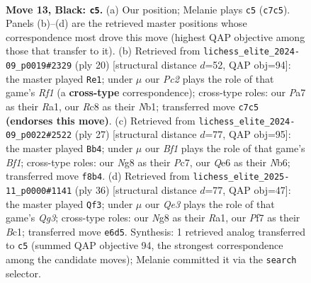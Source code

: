 \documentclass[11pt]{article}
\begin{document}
\clearpage

\begin{figure}[p]\centering
\begin{subfigure}{0.46\textwidth}\centering
\resizebox{\linewidth}{!}{%
\newchessgame
\chessboard[
  setfen={2r1kbnr/pbpp1ppp/4q3/4P3/2p2PPP/2P4R/PP3Q2/RNB1KB2 b Qk - 4 13},
  showmover=false,
  pgfstyle=straightmove, color=movearrow, markmove={c7-c5}
]}
\caption{}
\end{subfigure}\hfill
\begin{subfigure}{0.46\textwidth}\centering
\resizebox{\linewidth}{!}{%
\newchessgame
\chessboard[
  setfen={r3kbnr/2pq1pp1/p1pp4/4P2p/3p4/5Q1P/PPP2PP1/RNB2RK1 w kq - 1 11},
  showmover=false,
  pgfstyle=straightmove, color=movearrow, markmove={f1-e1}
]}
\caption{}
\end{subfigure}
\\[4pt]
\begin{subfigure}{0.46\textwidth}\centering
\resizebox{\linewidth}{!}{%
\newchessgame
\chessboard[
  setfen={r3kb1r/1bpp1ppp/1np1q3/4P3/2P2P2/1PN5/2Q3PP/1RB1KB1R b Kkq - 0 14},
  showmover=false,
  pgfstyle=straightmove, color=movearrow, markmove={f8-b4}
]}
\caption{}
\end{subfigure}\hfill
\begin{subfigure}{0.46\textwidth}\centering
\resizebox{\linewidth}{!}{%
\newchessgame
\chessboard[
  setfen={r3k2r/1pq2p2/pn2bb1p/4p3/2p5/N1P3QP/P1BP1PP1/R1B1R1K1 w kq - 0 19},
  showmover=false,
  pgfstyle=straightmove, color=movearrow, markmove={g3-f3}
]}
\caption{}
\end{subfigure}
\caption{\textbf{Move 13, Black: \texttt{c5}.} (a) Our position; Melanie plays \texttt{c5} (\texttt{c7c5}). Panels (b)--(d) are the retrieved master positions whose correspondence most drove this move (highest QAP objective among those that transfer to it). (b) Retrieved from \texttt{lichess\_elite\_2024-09\_p0019\#2329} (ply 20) [structural distance $d$=52, QAP obj=94]: the master played \texttt{Re1}; under $\mu$ our \emph{Pc2} plays the role of that game's \emph{Rf1} (a \textbf{cross-type} correspondence); cross-type roles: our \emph{P}a7 as their \emph{R}a1, our \emph{R}c8 as their \emph{N}b1; transferred move \texttt{c7c5} \textbf{(endorses this move)}. (c) Retrieved from \texttt{lichess\_elite\_2024-09\_p0022\#2522} (ply 27) [structural distance $d$=77, QAP obj=95]: the master played \texttt{Bb4}; under $\mu$ our \emph{Bf1} plays the role of that game's \emph{Bf1}; cross-type roles: our \emph{N}g8 as their \emph{P}c7, our \emph{Q}e6 as their \emph{N}b6; transferred move \texttt{f8b4}. (d) Retrieved from \texttt{lichess\_elite\_2025-11\_p0000\#1141} (ply 36) [structural distance $d$=77, QAP obj=47]: the master played \texttt{Qf3}; under $\mu$ our \emph{Qe3} plays the role of that game's \emph{Qg3}; cross-type roles: our \emph{N}g8 as their \emph{R}a1, our \emph{P}f7 as their \emph{B}c1; transferred move \texttt{e6d5}. Synthesis: 1 retrieved analog transferred to \texttt{c5} (summed QAP objective 94, the strongest correspondence among the candidate moves); Melanie committed it via the \texttt{search} selector.}
\label{fig:thought-m25}
\end{figure}
\end{document}
